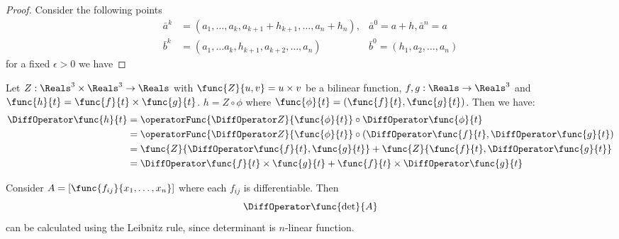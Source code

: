 \begin{proof}
    Consider the following points
    \begin{align*}
        \bar{a}^k & = (a_1, \dots , a_k, a_{k+1} + h_{k+1}, \dots , a_n + h_n), & \bar{a}^0 = a + h , \bar{a}^n = a  \\
        \bar{b}^k & = (a_1, \dots a_k, h_{k+1},a_{k+2}, \dots, a_n)             & \bar{b}^0 = (h_1, a_2, \dots, a_n)
    \end{align*}
    for a fixed \(\epsilon > 0\) we have
\end{proof}

\begin{example}
    Let \(Z: \Reals^3 \times \Reals^3 \to \Reals\) with \(\func{Z}{u,v}= u \times v\) be a bilinear function, \(f,g: \Reals \to \Reals^3\) and \(\func{h}{t} = \func{f}{t} \times \func{g}{t}\). \(h = Z \circ \phi\) where \(\func{\phi}{t} = (\func{f}{t},\func{g}{t})\). Then we have:
    \begin{align*}
        \DiffOperator \func{h}{t} & = \operatorFunc{\DiffOperator Z}{\func{\phi}{t}}\circ \DiffOperator \func{\phi}{t}                             \\
                                  & =  \operatorFunc{\DiffOperator Z}{\func{\phi}{t}} \circ (\DiffOperator \func{f}{t}, \DiffOperator \func{g}{t}) \\
                                  & = \func{Z}{\DiffOperator \func{f}{t}, \func{g}{t}} + \func{Z}{ \func{f}{t}, \DiffOperator \func{g}{t}}         \\
                                  & = \DiffOperator \func{f}{t} \times \func{g}{t} + \func{f}{t} \times \DiffOperator \func{g}{t}
    \end{align*}
\end{example}

\begin{example}
    Consider \(A = [\func{f_{ij}}{x_1, \dots , x_n}]\) where each \(f_{ij}\) is differentiable. Then
    \begin{equation*}
        \DiffOperator \func{\det}{A}
    \end{equation*}
    can be calculated using the Leibnitz rule, since determinant is \(n\)-linear function.
\end{example}

